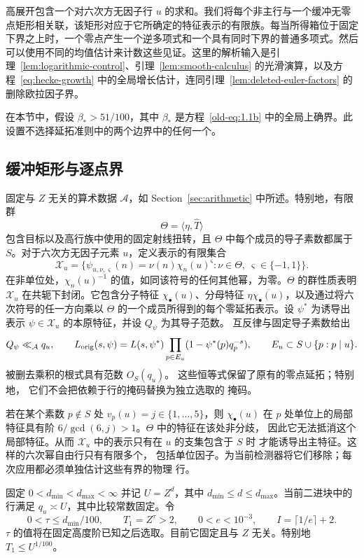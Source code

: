 \documentclass[11pt,a4paper]{article}
\numberwithin{equation}{section}
\numberwithin{figure}{section}
\theoremstyle{definition}
\theoremstyle{remark}
\begin{document}
高展开包含一个对六次方无因子行 \(u\) 的求和。我们将每个非主行与一个缓冲无零点矩形相关联，该矩形对应于它所确定的特征表示的有限族。每当所得箱位于固定下界之上时，一个零点产生一个逆多项式和一个具有同时下界的普通多项式。然后可以使用不同的均值估计来计数这些见证。这里的解析输入是引理~\ref{lem:logarithmic-control}、引理~\ref{lem:smooth-calculus} 的光滑演算，以及方程~\eqref{eq:hecke-growth} 中的全局增长估计，连同引理~\ref{lem:deleted-euler-factors} 的删除欧拉因子界。

在本节中，假设 \(\beta_*>51/100\)，其中 \(\beta_*\) 是方程~\eqref{old-eq:1.1b} 中的全局上确界。此设置不选择延拓准则中的两个边界中的任何一个。

\subsection{缓冲矩形与逐点界}

固定与 $Z$ 无关的算术数据 \(\mathcal A\)，如 Section~\ref{sec:arithmetic} 中所述。特别地，有限群
\[
 \Theta=\langle\eta,\widehat T\rangle
\]
包含目标以及高行族中使用的固定射线扭转，且 \(\Theta\) 中每个成员的导子素数都属于 \(S\)。对于六次方无因子元素 \(u\)，定义表示的有限集合
\[
 \mathcal X_u=
 \bigl\{\psi_{u,\nu,\varsigma}(n)=\nu(n)\chi_n(u)^\varsigma:
       \nu\in\Theta,\ \varsigma\in\{-1,1\}\bigr\}.
\]
在非单位处，$\chi_n(u)^{-1}$ 的值，如同该符号的任何其他幂，为零。\(\Theta\) 的群性质表明 \(\mathcal X_u\) 在共轭下封闭。它包含分子特征 \(\chi_\bullet(u)\)、分母特征 \(\eta\overline{\chi_\bullet(u)}\)，以及通过将六次符号的任一方向乘以 \(\Theta\) 的一个成员所得到的每个零延拓表示。设 \(\psi^*\) 为诱导出表示 \(\psi\in\mathcal X_u\) 的本原特征，并设 \(Q_\psi\) 为其导子范数。
互反律与固定导子素数给出
\[
 Q_\psi\ll_{\mathcal A}q_u,\qquad
 L_{\rm orig}(s,\psi)
   =L(s,\psi^*)\prod_{p\in E_u}(1-\psi^*(p)q_p^{-s}),
 \qquad
 E_u\subset S\cup\{p:p\mid u\}.
\]
被删去乘积的根式具有范数 \(O_S(q_u)\)。
这些恒等式保留了原有的零点延拓；特别地，
它们不会把依赖于行的掩码替换为独立选取的
掩码。

\label{par:physical-row-ramification}
若在某个素数 \(p\notin S\) 处 \(v_p(u)=j\in\{1,\ldots,5\}\)，则
\(\chi_\bullet(u)\) 在 \(p\) 处单位上的局部特征具有阶
\(6/\gcd(6,j)>1\)。\(\Theta\) 中的特征在该处非分歧，
因此它无法抵消这个局部特征。从而
\(\mathcal X_u\) 中的表示只有在 \(u\) 的支集包含于 \(S\) 时
才能诱导出主特征。这样的六次幂自由行只有有限多个，
包括单位因子。为当前检测器将它们移除；每次应用都必须单独估计这些有界的物理
行。

固定 \(0<d_{\min}<d_{\max}<\infty\) 并记 \(U=Z^d\)，其中
\(d_{\min}\le d\le d_{\max}\)。当前二进块中的行满足
\(q_u\asymp U\)，其中比较常数固定。令
\[
 0<\tau\le d_{\min}/100,\qquad T_1=Z^\tau>2,\qquad
 0<e<10^{-3},\qquad I=\lceil1/e\rceil+2.
\]
\(\tau\) 的值将在固定高度阶已知之后选取。目前它固定且与 \(Z\) 无关。特别地
\(T_1\le U^{1/100}\)。
\end{document}
